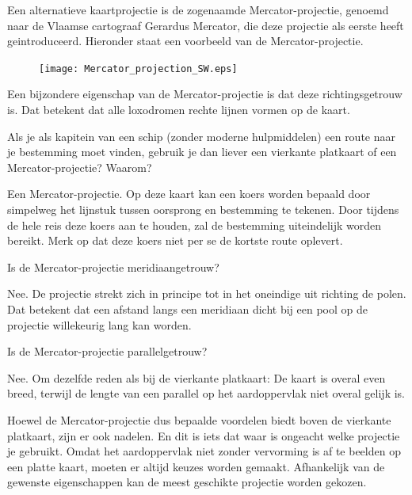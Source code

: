 Een alternatieve kaartprojectie is de zogenaamde Mercator-projectie, genoemd naar de Vlaamse cartograaf Gerardus Mercator, die deze projectie als eerste heeft geintroduceerd. Hieronder staat een voorbeeld van de Mercator-projectie.

\begin{figure}[h]
	\centering
	\texttt{[image: Mercator\_projection\_SW.eps]}
\end{figure}
Een bijzondere eigenschap van de Mercator-projectie is dat deze richtingsgetrouw is. Dat betekent dat alle loxodromen rechte lijnen vormen op de kaart.

\begin{opgave}
	Als je als kapitein van een schip (zonder moderne hulpmiddelen) een route naar je bestemming moet vinden, gebruik je dan liever een vierkante platkaart of een Mercator-projectie? Waarom?
	\begin{antwoord}
		Een Mercator-projectie. Op deze kaart kan een koers worden bepaald door simpelweg het lijnstuk tussen oorsprong en bestemming te tekenen. Door tijdens de hele reis deze koers aan te houden, zal de bestemming uiteindelijk worden bereikt. Merk op dat deze koers niet per se de kortste route oplevert.
	\end{antwoord}
\end{opgave}

\begin{opgave}
	\begin{subopgave}
		Is de Mercator-projectie meridiaangetrouw?
		\begin{antwoord}
			Nee. De projectie strekt zich in principe tot in het oneindige uit richting de polen. Dat betekent dat een afstand langs een meridiaan dicht bij een pool op de projectie willekeurig lang kan worden.
		\end{antwoord}
	\end{subopgave}
	\begin{subopgave}
		Is de Mercator-projectie parallelgetrouw?
		\begin{antwoord}
			Nee. Om dezelfde reden als bij de vierkante platkaart: De kaart is overal even breed, terwijl de lengte van een parallel op het aardoppervlak niet overal gelijk is.
		\end{antwoord}
	\end{subopgave}
\end{opgave}

Hoewel de Mercator-projectie dus bepaalde voordelen biedt boven de vierkante platkaart, zijn er ook nadelen. En dit is iets dat waar is ongeacht welke projectie je gebruikt. Omdat het aardoppervlak niet zonder vervorming is af te beelden op een platte kaart, moeten er altijd keuzes worden gemaakt. Afhankelijk van de gewenste eigenschappen kan de meest geschikte projectie worden gekozen.

